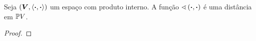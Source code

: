 \begin{proposition}
Seja $(\bm V,\left\langle{\bm{\cdot}},{\bm{\cdot}}\right\rangle)$ um espaço com produto interno. A função $\sphericalangle\left({\bm{\cdot}},{\bm{\cdot}}\right)$ é uma distância em $\mathbb{P} V$.
\end{proposition}
\begin{proof}
\begin{comment}



(Desigualdade Triangular) Sejam $r,r',r'' \in \pro V$, $u \in r \cap \S$, $u' \in r' \cap \S$ e $u'' \in r'' \cap \S$. Queremos mostrar que
	\begin{equation*}
	\ang{r}{r''} \leq \ang{r}{r'} + \ang{r'}{r''}.
	\end{equation*}
Isso é o mesmo que
	\begin{equation*}
	\cos\inv (\abs{\inte{u}{u''}}) \leq \cos\inv (\abs{\inte{u}{u'}}) + \cos\inv (\abs{\inte{u'}{u''}}).
	\end{equation*}

Se mostrarmos que
	\begin{equation*}
	\abs{\inte{u}{u''}} \geq \abs{\inte{u}{u'}} + \abs{\inte{u'}{u''}},
	\end{equation*}
segue da monotonicidade decrescente de $\cos\inv$.
	\begin{align*}
	\abs{\inte{u}{u'}+\inte{u'}{u''}} \leq \abs{\inte{u}{u'}} + \abs{\inte{u'}{u''}}
	\end{align*}
	\begin{align*}
	\inte{u}{u'}+\inte{u''}{u'} = \inte{u+u''}{u'}
	\end{align*}


\end{comment}
\end{proof}
